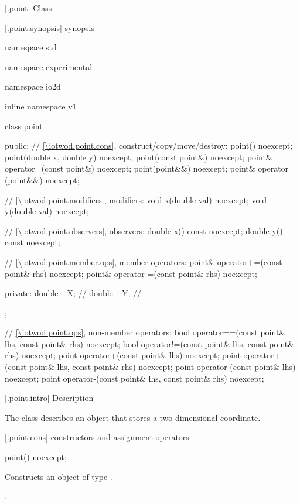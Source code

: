  [\iotwod.point] {Class }

 [\iotwod.point.synopsis] { synopsis}

\begin{codeblock}
namespace std { namespace experimental { namespace io2d { inline namespace v1 {
  class point {
  public:
    // \ref{\iotwod.point.cons}, construct/copy/move/destroy:
    point() noexcept;
    point(double x, double y) noexcept;
    point(const point&) noexcept;
    point& operator=(const point&) noexcept;
    point(point&&) noexcept;
    point& operator=(point&&) noexcept;

    // \ref{\iotwod.point.modifiers}, modifiers:
    void x(double val) noexcept;
    void y(double val) noexcept;
    
    // \ref{\iotwod.point.observers}, observers:
    double x() const noexcept;
    double y() const noexcept;
    
    // \ref{\iotwod.point.member.ops}, member operators:
    point& operator+=(const point& rhs) noexcept;
    point& operator-=(const point& rhs) noexcept;
    
  private:
    double _X; // \expos
    double _Y; // \expos
  };
  
  // \ref{\iotwod.point.ops}, non-member operators:
  bool operator==(const point& lhs, const point& rhs) noexcept;
  bool operator!=(const point& lhs, const point& rhs) noexcept;
  point operator+(const point& lhs) noexcept;
  point operator+(const point& lhs, const point& rhs) noexcept;
  point operator-(const point& lhs) noexcept;
  point operator-(const point& lhs, const point& rhs) noexcept;
} } } }
\end{codeblock}

 [\iotwod.point.intro] { Description}

\pnum
{}%
The class  describes an object that stores a two-dimensional coordinate.

 [\iotwod.point.cons] { constructors and assignment operators}

\begin{itemdecl}
point() noexcept;
\end{itemdecl}
\begin{itemdescr}
	\pnum
	\effects
	Constructs an object of type .
	
	\pnum
	\postconditions
	.
\end{itemdescr}


